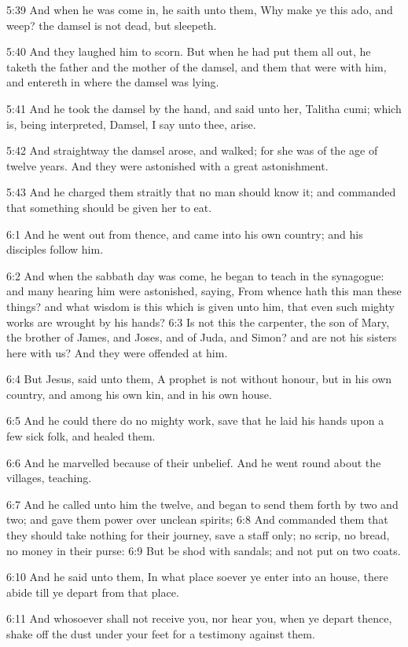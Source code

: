 5:39 And when he was come in, he saith unto them, Why make ye this
ado, and weep? the damsel is not dead, but sleepeth.

5:40 And they laughed him to scorn. But when he had put them all out,
he taketh the father and the mother of the damsel, and them that were
with him, and entereth in where the damsel was lying.

5:41 And he took the damsel by the hand, and said unto her, Talitha
cumi; which is, being interpreted, Damsel, I say unto thee, arise.

5:42 And straightway the damsel arose, and walked; for she was of the
age of twelve years. And they were astonished with a great
astonishment.

5:43 And he charged them straitly that no man should know it; and
commanded that something should be given her to eat.

6:1 And he went out from thence, and came into his own country; and
his disciples follow him.

6:2 And when the sabbath day was come, he began to teach in the
synagogue: and many hearing him were astonished, saying, From whence
hath this man these things? and what wisdom is this which is given
unto him, that even such mighty works are wrought by his hands?  6:3
Is not this the carpenter, the son of Mary, the brother of James, and
Joses, and of Juda, and Simon? and are not his sisters here with us?
And they were offended at him.

6:4 But Jesus, said unto them, A prophet is not without honour, but in
his own country, and among his own kin, and in his own house.

6:5 And he could there do no mighty work, save that he laid his hands
upon a few sick folk, and healed them.

6:6 And he marvelled because of their unbelief. And he went round
about the villages, teaching.

6:7 And he called unto him the twelve, and began to send them forth by
two and two; and gave them power over unclean spirits; 6:8 And
commanded them that they should take nothing for their journey, save a
staff only; no scrip, no bread, no money in their purse: 6:9 But be
shod with sandals; and not put on two coats.

6:10 And he said unto them, In what place soever ye enter into an
house, there abide till ye depart from that place.

6:11 And whosoever shall not receive you, nor hear you, when ye depart
thence, shake off the dust under your feet for a testimony against
them.

